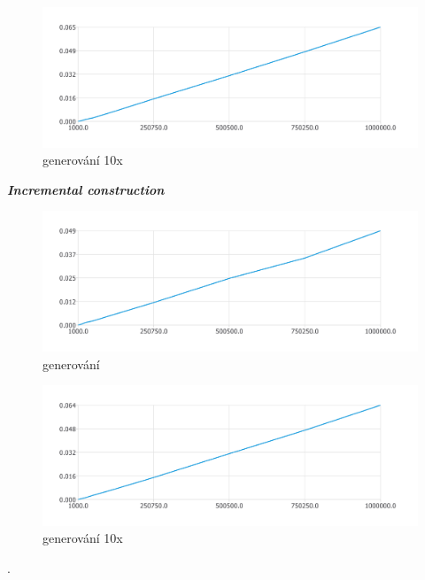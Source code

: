 \documentclass{article}
\begin{document}
\begin{figure}[htbp]
\centering
        \includegraphics[clip, trim=0cm 0cm 0cm 0cm, width=1\textwidth]{grq.pdf}
        \caption{generování 10x}
\end{figure}
\clearpage
\newpage
\textit{\textbf {Incremental construction}}
\\
\begin{figure}[htbp]
\centering
        \includegraphics[clip, trim=0cm 0cm 0cm 0cm, width=1\textwidth]{pdf16.pdf}
        \caption{generování}
\end{figure}
\begin{figure}[htbp]
\centering
        \includegraphics[clip, trim=0cm 0cm 0cm 0cm, width=1\textwidth]{gri.pdf}
        \caption{generování 10x}
\end{figure}
.\\
\bigskip
\clearpage
\newpage
\end{document}
